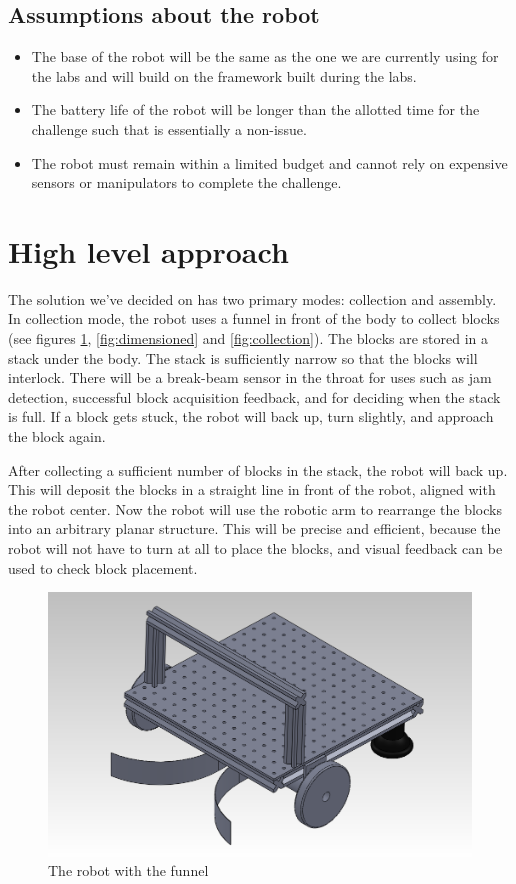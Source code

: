 \documentclass[letterpaper,11pt]{article}
\begin{document}
\subsection{Assumptions about the robot}
\begin{itemize}
 \item The base of the robot will be the same as the one we are currently using for the labs and will build on the framework built during the labs.  
 \item The battery life of the robot will be longer than the allotted time for the challenge such that is essentially a non-issue.
 \item The robot must remain within a limited budget and cannot rely on expensive sensors or manipulators to complete the challenge.
\end{itemize}

\section{High level approach}
The solution we've decided on has two primary modes: collection and assembly.
In collection mode, the robot uses a funnel in front of the body to collect blocks
(see figures \ref{fig:robotFunnel}, \ref{fig:dimensioned} and \ref{fig:collection}).
The blocks are stored in a stack under the body.
The stack is sufficiently narrow so that the blocks will interlock.
There will be a break-beam sensor in the throat for uses such as jam detection,
successful block acquisition feedback, and for deciding when the stack is full.
If a block gets stuck, the robot will back up, turn slightly, and approach the block again.

After collecting a sufficient number of blocks in the stack, the robot will back up.
This will deposit the blocks in a straight line in front of the robot, aligned with the robot center.
Now the robot will use the robotic arm to rearrange the blocks into an arbitrary planar structure.
This will be precise and efficient, because the robot will not have to turn at all to place the blocks,
and visual feedback can be used to check block placement.
\begin{figure}[h]
 \centering
  \includegraphics[width=4.5in]{images/AssemblyIso}
\caption{The robot with the funnel}
\label{fig:robotFunnel}
\end{figure}
\end{document}
